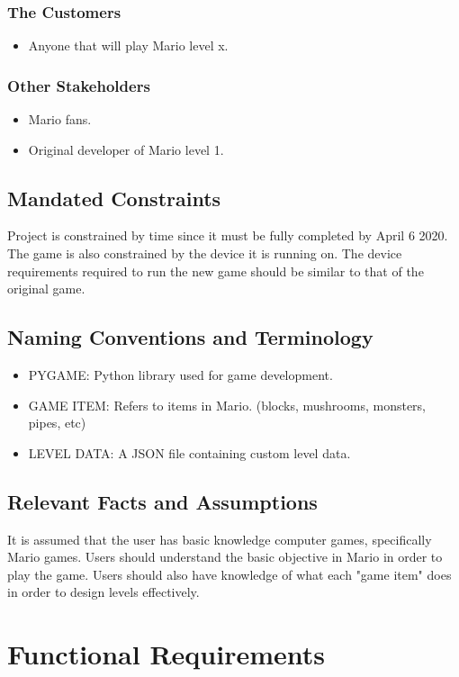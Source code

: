 \documentclass[12pt, titlepage]{article}
\begin{document}
\subsubsection{The Customers}
\begin{itemize}
    \item Anyone that will play Mario level x.
\end{itemize}

\subsubsection{Other Stakeholders}
\begin{itemize}
    \item Mario fans.
    \item Original developer of Mario level 1.
\end{itemize}
\subsection{Mandated Constraints}
Project is constrained by time since it must be fully completed by April 6 2020. The game is also constrained by the device it is running on. The device requirements required to run the new game should be similar to that of the original game.
\subsection{Naming Conventions and Terminology}

\begin{itemize}
    \item PYGAME: Python library used for game development.
    \item GAME ITEM: Refers to items in Mario. (blocks, mushrooms, monsters, pipes, etc)
    \item LEVEL DATA: A JSON file containing custom level data.
\end{itemize}

\subsection{Relevant Facts and Assumptions}
It is assumed that the user has basic knowledge computer games, specifically Mario games. Users should understand the basic objective in Mario in order to play the game. Users should also have knowledge of what each "game item" does in order to design levels effectively.

\section{Functional Requirements}
\end{document}
